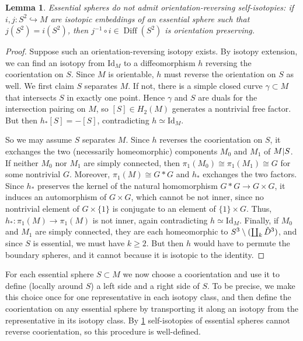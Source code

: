 \documentclass{amsart}
\theoremstyle{plain}
\newtheorem{lem}[thm]{Lemma}
\theoremstyle{definition}
\DeclareMathOperator\Diff{Diff}
\newcommand{\interior}[1]{\smash{\mathring{#1}}}
\newcommand{\ca}{\smash{\mid}} %
\begin{document}
\begin{lem}\label{lem:reversing-coorientation}
    Essential spheres do not admit orientation-reversing self-isotopies:
    if $i,j\colon S^2 \hookrightarrow M$ are isotopic embeddings of an essential sphere such that $j(S^2) = i(S^2)$, then $j^{-1} \circ i \in \Diff(S^2)$ is orientation preserving.
\end{lem}
\begin{proof}
    Suppose such an orientation-reversing isotopy exists. 
    By isotopy extension, we can find an isotopy from $\textrm{Id}_M$ to a diffeomorphism $h$ reversing the coorientation on $S$. Since $M$ is orientable, $h$ must reverse the orientation on $S$ as well. 
    We first claim $S$ separates $M$. If not, there is a simple closed curve $\gamma\subset M$ that intersects $S$ in exactly one point. Hence $\gamma$ and $S$ are duals for the intersection pairing on $M$, so $[S]\in H_2(M)$ generates a nontrivial free factor. But then $h_*[S]=-[S]$, contradicting $h\simeq\textrm{Id}_M$.
 
    So we may assume $S$ separates $M$. Since $h$ reverses the coorientation on $S$, it exchanges the two (necessarily homeomorphic) components $M_0$ and $M_1$ of $M\ca S$.  If neither  $M_0$ nor $M_1$ are simply connected, then $\pi_1(M_0)\cong \pi_1(M_1)\cong G$ for some nontrivial $G$. Moreover, $\pi_1(M)\cong G*G$ and $h_*$ exchanges the two factors. Since $h_*$ preserves the kernel of the natural homomorphism $G*G\rightarrow G\times G$, it induces an automorphism of $G\times G$, which cannot be not inner, since no nontrivial element of $G\times\{1\}$ is conjugate to an element of $\{1\}\times G$. Thus, $h_*\colon \pi_1(M) \to \pi_1(M)$ is not inner, again contradicting $h\simeq \textrm{Id}_M$. 
    Finally, if $M_0$ and $M_1$ are simply connected, they are each homeomorphic to $S^3\setminus (\coprod_k\interior{D}^3)$, and since $S$ is essential, we must have $k\geq 2$. 
    But then $h$ would have to permute the boundary spheres, and it cannot because it is isotopic to the identity.
\end{proof}

    For each essential sphere $S \subset M$ we now choose a coorientation and use it to define (locally around $S$) a left side and a right side of $S$.
    To be precise, we make this choice once for one representative in each isotopy class, and then define the coorientation on any essential sphere by transporting it along an isotopy from the representative in its isotopy class.
    By \cref{lem:reversing-coorientation} self-isotopies of essential spheres cannot reverse coorientation, so this procedure is well-defined.
\end{document}
